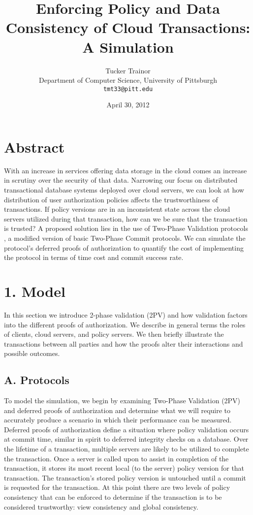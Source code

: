\documentclass[11pt]{article}
\title{Enforcing Policy and Data Consistency of Cloud Transactions: A Simulation}
\author{Tucker Trainor\\Department of Computer Science, University of Pittsburgh\\\texttt{tmt33@pitt.edu}}
\date{April 30, 2012} %
\begin{document}
\maketitle
\section{Abstract}
With an increase in services offering data storage in the cloud comes an increase in scrutiny over the security of that data. Narrowing our focus on distributed transactional database systems deployed over cloud servers, we can look at how distribution of user authorization policies affects the trustworthiness of transactions. If policy versions are in an inconsistent state across the cloud servers utilized during that transaction, how can we be sure that the transaction is trusted? A proposed solution lies in the use of Two-Phase Validation protocols \cite{Iskander}, a modified version of basic Two-Phase Commit protocols. We can simulate the protocol's deferred proofs of authorization to quantify the cost of implementing the protocol in terms of time cost and commit success rate.
\section{1. Model}
In this section we introduce 2-phase validation (2PV) \cite{Iskander} and how validation factors into the different proofs of authorization. We describe in general terms the roles of clients, cloud servers, and policy servers. We then briefly illustrate the transactions between all parties and how the proofs alter their interactions and possible outcomes.
\subsection{A. Protocols}
To model the simulation, we begin by examining Two-Phase Validation (2PV) and deferred proofs of authorization and determine what we will require to accurately produce a scenario in which their performance can be measured.
Deferred proofs of authorization  define a situation where policy validation occurs at commit time, similar in spirit to deferred integrity checks on a database. Over the lifetime of a transaction, multiple servers are likely to be utilized to complete the transaction. Once a server is called upon to assist in completion of the transaction, it stores its most recent local (to the server) policy version for that transaction. The transaction's stored policy version is untouched until a commit is requested for the transaction. At this point there are two levels of policy consistency that can be enforced to determine if the transaction is to be considered trustworthy: view consistency and global consistency.
\end{document}
